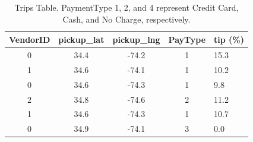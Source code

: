 

\begin{table}
\small
\centering
\caption{\small Trips Table. PaymentType 1, 2, and 4 represent Credit Card, Cash, and No Charge, respectively.}
  \begin{tabular}{| c | c | c | c | l |}
    \hline
    {\bf VendorID} & \textbf{pickup\_lat} & \textbf{pickup\_lng} & \textbf{PayType} & \textbf{tip (\%)} \\ \hline
    0 & 34.4 & -74.2 & 1 & 15.3 \\ \hline
    1 & 34.6 & -74.1 & 1 & 10.2 \\ \hline
    0 & 34.6 & -74.3 & 1 & 9.8 \\ \hline
    2 & 34.8 & -74.6 & 2 & 11.2 \\ \hline
    1 & 34.6 & -74.3 & 1 & 10.7 \\ \hline
    0 & 34.9 & -74.1 & 3 & 0.0 \\
    \hline
  \end{tabular}
  \label{tbl:fact}
\end{table}


